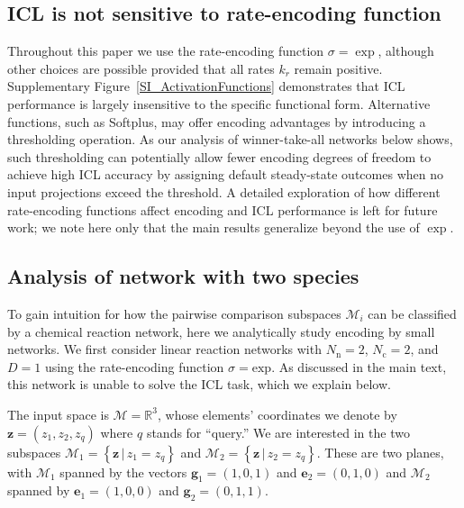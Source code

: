 \documentclass[%
reprint,
superscriptaddress,
amsmath,amssymb,
aps,
]{revtex4-2}
\begin{document}
\begin{onecolumngrid}
		\subsection{ICL is not sensitive to rate-encoding function}\label{SIsec:rateencode}
		
		Throughout this paper we use the rate-encoding function $\sigma = \exp$, although other choices are possible provided that all rates $k_r$ remain positive. Supplementary Figure~\ref{SI_ActivationFunctions} demonstrates that ICL performance is largely insensitive to the specific functional form. Alternative functions, such as Softplus, may offer encoding advantages by introducing a thresholding operation. As our analysis of winner-take-all networks below shows, such thresholding can potentially allow fewer encoding degrees of freedom to achieve high ICL accuracy by assigning default steady-state outcomes when no input projections exceed the threshold. A detailed exploration of how different rate-encoding functions affect encoding and ICL performance is left for future work; we note here only that the main results generalize beyond the use of $\exp$.
		
		\subsection{Analysis of network with two species}\label{SIsec:twospecies}
		To gain intuition for how the pairwise comparison subspaces $\mathcal{M}_i$ can be classified by a chemical reaction network, here we analytically study encoding by small networks.  We first consider linear reaction networks with $N_\text{n} = 2$, $N_\text{c} = 2$, and $D=1$ using the rate-encoding function $\sigma = \text{exp}$.  As discussed in the main text, this network is unable to solve the ICL task, which we explain below.  
		
		The input space is $\mathcal{M} = \mathbb{R}^3$, whose elements' coordinates we denote by $\mathbf{z} = (z_1, z_2, z_q)$ where $q$ stands for ``query.''    We are interested in the two subspaces $\mathcal{M}_1 = \left\{\mathbf{z} \,\big|\, z_1 = z_q\right\}$ and $\mathcal{M}_2 = \left\{\mathbf{z} \,\big|\, z_2 = z_q\right\}$.  These are two planes, with $\mathcal{M}_1$ spanned by the vectors $\mathbf{g}_1 = (1, 0, 1)$ and $\mathbf{e}_2 = (0, 1, 0)$ and $\mathcal{M}_2$ spanned by $\mathbf{e}_1 = (1, 0, 0)$ and $\mathbf{g}_2 = (0, 1, 1)$.
		

\end{onecolumngrid}
\end{document}
